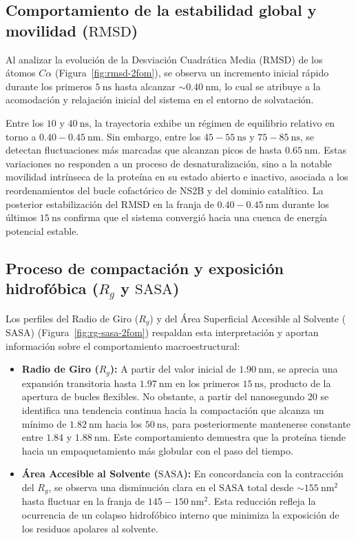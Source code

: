 \subsection{Comportamiento de la estabilidad global y movilidad ($\text{RMSD}$)}

Al analizar la evolución de la Desviación Cuadrática Media ($\text{RMSD}$) de los átomos $C\alpha$ (Figura~\ref{fig:rmsd-2fom}), se observa un incremento inicial rápido durante los primeros $5\ \text{ns}$ hasta alcanzar $\sim 0.40\ \text{nm}$, lo cual se atribuye a la acomodación y relajación inicial del sistema en el entorno de solvatación.

Entre los $10$ y $40\ \text{ns}$, la trayectoria exhibe un régimen de equilibrio relativo en torno a $0.40 - 0.45\ \text{nm}$. Sin embargo, entre los $45 - 55\ \text{ns}$ y $75 - 85\ \text{ns}$, se detectan fluctuaciones más marcadas que alcanzan picos de hasta $0.65\ \text{nm}$. Estas variaciones no responden a un proceso de desnaturalización, sino a la notable movilidad intrínseca de la proteína en su estado abierto e inactivo, asociada a los reordenamientos del bucle cofactórico de NS2B y del dominio catalítico. La posterior estabilización del $\text{RMSD}$ en la franja de $0.40 - 0.45\ \text{nm}$ durante los últimos $15\ \text{ns}$ confirma que el sistema convergió hacia una cuenca de energía potencial estable.

\subsection{Proceso de compactación y exposición hidrofóbica ($R_g$ y $\text{SASA}$)}

Los perfiles del Radio de Giro ($R_g$) y del Área Superficial Accesible al Solvente ($\text{SASA}$) (Figura~\ref{fig:rg-sasa-2fom}) respaldan esta interpretación y aportan información sobre el comportamiento macroestructural:

\begin{itemize}
    \item \textbf{Radio de Giro ($R_g$):} A partir del valor inicial de $1.90\ \text{nm}$, se aprecia una expansión transitoria hasta $1.97\ \text{nm}$ en los primeros $15\ \text{ns}$, producto de la apertura de bucles flexibles. No obstante, a partir del nanosegundo $20$ se identifica una tendencia continua hacia la compactación que alcanza un mínimo de $1.82\ \text{nm}$ hacia los $50\ \text{ns}$, para posteriormente mantenerse constante entre $1.84$ y $1.88\ \text{nm}$. Este comportamiento demuestra que la proteína tiende hacia un empaquetamiento más globular con el paso del tiempo.
    
    \item \textbf{Área Accesible al Solvente ($\text{SASA}$):} En concordancia con la contracción del $R_g$, se observa una disminución clara en el $\text{SASA}$ total desde $\sim 155\ \text{nm}^2$ hasta fluctuar en la franja de $145 - 150\ \text{nm}^2$. Esta reducción refleja la ocurrencia de un colapso hidrofóbico interno que minimiza la exposición de los residuos apolares al solvente.
\end{itemize}

